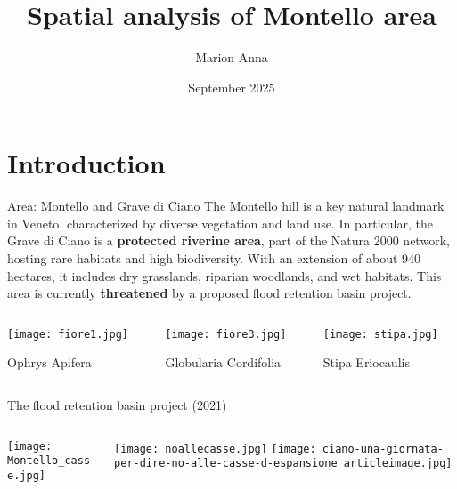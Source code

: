\documentclass{beamer}
\title{Spatial analysis of Montello area}
\author{Marion Anna}
\date{September 2025}
\begin{document}
\maketitle

\section{Introduction}

\begin{frame}{Area: Montello and Grave di Ciano}
The Montello hill is a key natural landmark in Veneto, characterized by diverse vegetation and land use. In particular, the Grave di Ciano is a \textbf{protected riverine area}, part of the Natura 2000 network, hosting rare habitats and high biodiversity. With an extension of about 940 hectares, it includes dry grasslands, riparian woodlands, and wet habitats. This area is currently \textbf{threatened} by a proposed flood retention basin project.
\begin{columns}
\begin{column}{0.3\textwidth}
    \texttt{[image: fiore1.jpg]}
    \caption{\footnotesize Ophrys Apifera}
\end{column}
\begin{column}{0.3\textwidth}  
    \begin{center}
     \texttt{[image: fiore3.jpg]}
     \caption{\footnotesize Globularia Cordifolia}
     \end{center}
     \end{column}
   \begin{column}{0.3\textwidth}
    \texttt{[image: stipa.jpg]}
    \caption{\footnotesize Stipa Eriocaulis}
\end{column}
\end{columns}
\end{frame}


\begin{frame}{The flood retention basin project (2021)}
\begin{columns}
  \begin{column}{0.5\textwidth}
    \texttt{[image: Montello\_casse.jpg]}
    \vspace{0.1}
  \end{column}
  \begin{column}{0.48\textwidth}
    \texttt{[image: noallecasse.jpg]}
    \vspace{0.2cm}
    \texttt{[image: ciano-una-giornata-per-dire-no-alle-casse-d-espansione\_articleimage.jpg]}
    \vspace{0.2cm}
  \end{column}

\end{columns}
\end{frame}
\end{document}
